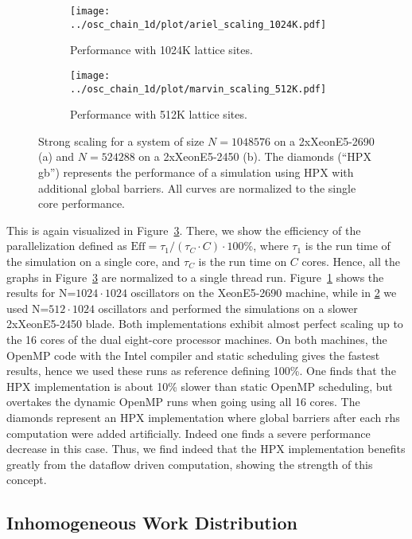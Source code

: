 \documentclass[10pt]{scrartcl}
\begin{document}
\begin{figure}
 \begin{subfigure}[b]{0.49\textwidth}
  \centering
  \texttt{[image: ../osc\_chain\_1d/plot/ariel\_scaling\_1024K.pdf]}\hfill
  \caption{Performance with 1024K lattice sites.} 
  \label{fig:scaling_ariel_1024K}
 \end{subfigure}
 \begin{subfigure}[b]{0.49\textwidth}
  \centering
  \texttt{[image: ../osc\_chain\_1d/plot/marvin\_scaling\_512K.pdf]}\hfill
  \caption{Performance with 512K lattice sites.} 
  \label{fig:scaling_marvin_512K}
 \end{subfigure}
 \caption{Strong scaling for a system of size $N=1048576$ on a 2xXeonE5-2690 (a) and $N=524288$ on a 2xXeonE5-2450 (b). The diamonds (``HPX gb'') represents the performance of a simulation using HPX with additional global barriers. All curves are normalized to the single core performance.
 }
 \label{fig:scaling1D}
\end{figure}

This is again visualized in Figure~\ref{fig:scaling1D}.
There, we show the efficiency of the parallelization defined as $\text{Eff} = \tau_1/(\tau_C\cdot C) \cdot100\%$, where $\tau_1$ is the run time of the simulation on a single core, and $\tau_C$ is the run time on $C$ cores.
Hence, all the graphs in Figure~\ref{fig:scaling1D} are normalized to a single thread run.
Figure~\ref{fig:scaling_ariel_1024K} shows the results for N=$1024\cdot1024$ oscillators on the XeonE5-2690 machine, while in \ref{fig:scaling_marvin_512K} we used N=$512\cdot1024$ oscillators and performed the simulations on a slower 2xXeonE5-2450 blade.
Both implementations exhibit almost perfect scaling up to the 16 cores of the dual eight-core processor machines.
On both machines, the OpenMP code with the Intel compiler and static scheduling gives the fastest results, hence we used these runs as reference defining 100\%.
One finds that the HPX implementation is about 10\% slower than static OpenMP scheduling, but overtakes the dynamic OpenMP runs when going using all 16 cores.
The diamonds represent an HPX implementation where global barriers after each rhs computation were added artificially.
Indeed one finds a severe performance decrease in this case.
Thus, we find indeed that the HPX implementation benefits greatly from the dataflow driven computation, showing the strength of this concept.

\subsection{Inhomogeneous Work Distribution}
\end{document}
